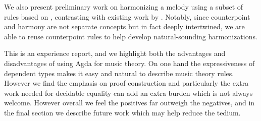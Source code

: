 We also present preliminary work on harmonizing a melody using
a subset of rules based on \citet{piston-harmony}, contrasting with
existing work by \citet{koops-fharm}. Notably, since counterpoint and
harmony are not separate concepts but in fact deeply intertwined, we
are able to reuse counterpoint rules to help develop natural-sounding
harmonizations.

This is an experience report, and we highlight both the advantages and
disadvantages of using Agda for music theory. On one hand the
expressiveness of dependent types makes it easy and natural to
describe music theory rules. However we find the emphasis on proof
construction and particularly the extra work needed for decidable
equality can add an extra burden which is not always welcome. However
overall we feel the positives far outweigh the negatives, and in the
final section we describe future work which may help reduce the tedium.

